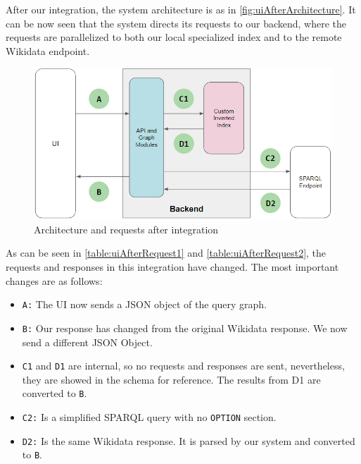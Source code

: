 After our integration, the system architecture is as in \autoref{fig:uiAfterArchitecture}. It can be now seen that the system directs its requests to our backend, where the requests are parallelized to both our local specialized index and to the remote Wikidata endpoint.

\begin{figure}[H]
    \centering
        \includegraphics[width=\linewidth]{imagenes/uiAfterRequest.png}
        \caption{Architecture and requests after integration}
        \label{fig:uiAfterArchitecture}
\end{figure}

As can be seen in \autoref{table:uiAfterRequest1} and \autoref{table:uiAfterRequest2}, the requests and responses in this integration have changed. The most important changes are as follows:
\begin{itemize}
    \item \texttt{A:} The UI now sends a JSON object of the query graph.
    \item \texttt{B:} Our response has changed from the original Wikidata response. We now send a different JSON Object.
    \item \texttt{C1} and \texttt{D1} are internal, so no requests and responses are sent, nevertheless, they are showed in the schema for reference. The results from D1 are converted to \texttt{B}.
    \item \texttt{C2:} Is a simplified SPARQL query with no \texttt{OPTION} section.
    \item \texttt{D2:} Is the same Wikidata response. It is parsed by our system and converted to \texttt{B}.
\end{itemize}
 
